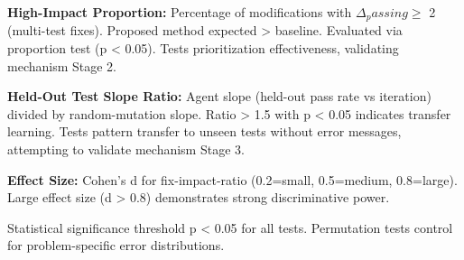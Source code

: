 \textbf{High-Impact Proportion:} Percentage of modifications with $\Delta _passing \geq$ 2 (multi-test fixes). Proposed method expected > baseline. Evaluated via proportion test (p < 0.05). Tests prioritization effectiveness, validating mechanism Stage 2.

\textbf{Held-Out Test Slope Ratio:} Agent slope (held-out pass rate vs iteration) divided by random-mutation slope. Ratio > 1.5 with p < 0.05 indicates transfer learning. Tests pattern transfer to unseen tests without error messages, attempting to validate mechanism Stage 3.

\textbf{Effect Size:} Cohen's d for fix-impact-ratio (0.2=small, 0.5=medium, 0.8=large). Large effect size (d > 0.8) demonstrates strong discriminative power.

Statistical significance threshold p < 0.05 for all tests. Permutation tests control for problem-specific error distributions.
